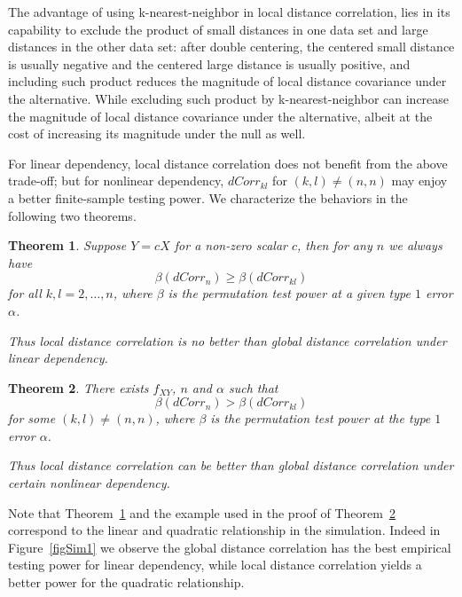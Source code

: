 \documentclass[11pt]{article}
\newtheorem{thm}{Theorem}
\begin{document}
The advantage of using k-nearest-neighbor in local distance correlation, lies in its capability to exclude the product of small distances in one data set and large distances in the other data set: after double centering, the centered small distance is usually negative and the centered large distance is usually positive, and including such product reduces the magnitude of local distance covariance under the alternative. While excluding such product by k-nearest-neighbor can increase the magnitude of local distance covariance under the alternative, albeit at the cost of increasing its magnitude under the null as well. 

For linear dependency, local distance correlation does not benefit from the above trade-off; but for nonlinear dependency, $dCorr_{kl}$ for $(k,l) \neq (n,n)$ may enjoy a better finite-sample testing power. We characterize the behaviors in the following two theorems.

\begin{thm}
\label{thm2}
Suppose $Y=cX$ for a non-zero scalar $c$, then for any $n$ we always have
\begin{equation}
\label{equ1}
\beta(dCorr_{n}) \geq \beta(dCorr_{kl})
\end{equation}
for all $k,l=2,\ldots,n$, where $\beta$ is the permutation test power at a given type $1$ error $\alpha$.

Thus local distance correlation is no better than global distance correlation under linear dependency.
\end{thm}

\begin{thm}
\label{thm3}
There exists $f_{XY}$, $n$ and $\alpha$ such that 
\begin{equation}
\label{equ2}
\beta(dCorr_{n}) > \beta(dCorr_{kl})
\end{equation}
for some $(k,l) \neq (n,n)$, where $\beta$ is the permutation test power at the type $1$ error $\alpha$.

Thus local distance correlation can be better than global distance correlation under certain nonlinear dependency.
\end{thm}
Note that Theorem~\ref{thm2} and the example used in the proof of Theorem~\ref{thm3} correspond to the linear and quadratic relationship in the simulation. Indeed in Figure~\ref{figSim1} we observe the global distance correlation has the best empirical testing power for linear dependency, while local distance correlation yields a better power for the quadratic relationship.
\end{document}
